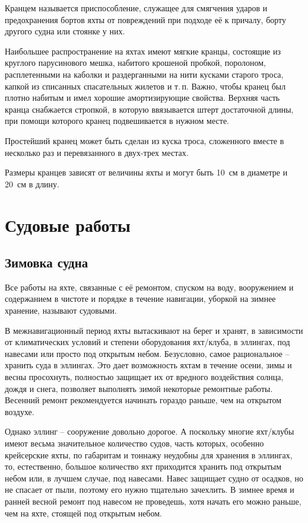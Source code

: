 \documentclass[a4paper, 12pt, twoside, final]{scrbook}
\begin{document}
Кранцем называется приспособление, служащее для смягчения ударов и предохранения бортов яхты от повреждений при подходе её к причалу, борту другого судна или стоянке у них.

Наибольшее распространение на яхтах имеют мягкие кранцы, состоящие из круглого парусинового мешка, набитого крошеной пробкой, поролоном, расплетенными на каболки и раздерганными на нити кусками старого троса, капкой из списанных спасательных жилетов и т.\,п. Важно, чтобы кранец был плотно набитым и имел хорошие амортизирующие свойства. Верхняя часть кранца снабжается стропкой, в которую ввязывается штерт достаточной длины, при помощи которого кранец подвешивается в нужном месте. 

Простейший кранец может быть сделан из куска троса, сложенного вместе в несколько раз и перевязанного в двух-трех местах.

Размеры кранцев зависят от величины яхты и могут быть 10~см в диаметре и 20~см в длину.

\chapter{Судовые работы}

\section{Зимовка судна}

Все работы на яхте, связанные с её ремонтом, спуском на воду, вооружением и содержанием в чистоте и порядке в течение навигации, уборкой на зимнее хранение, называют судовыми.

В межнавигационный период яхты вытаскивают на берег и хранят, в зависимости от климатических условий и степени оборудования яхт\-/клуба, в эллингах, под навесами или просто под открытым небом. Безусловно, самое рациональное \--- хранить суда в эллингах. Это дает возможность яхтам в течение осени, зимы и весны просохнуть, полностью защищает их от вредного воздействия солнца, дождя и снега, позволяет выполнять зимой некоторые ремонтные работы. Весенний ремонт рекомендуется начинать гораздо раньше, чем на открытом воздухе.

Однако эллинг \--- сооружение довольно дорогое. А поскольку многие яхт\-/клубы имеют весьма значительное количество судов, часть которых, особенно крейсерские яхты, по габаритам и тоннажу неудобны для хранения в эллингах, то, естественно, большое количество яхт приходится хранить под открытым небом или, в лучшем случае, под навесами. Навес защищает судно от осадков, но не спасает от пыли, поэтому его нужно тщательно зачехлить. В зимнее время и ранней весной ремонт под навесом не проведешь, хотя начать его можно раньше, чем на яхте, стоящей под открытым небом.
\end{document}
